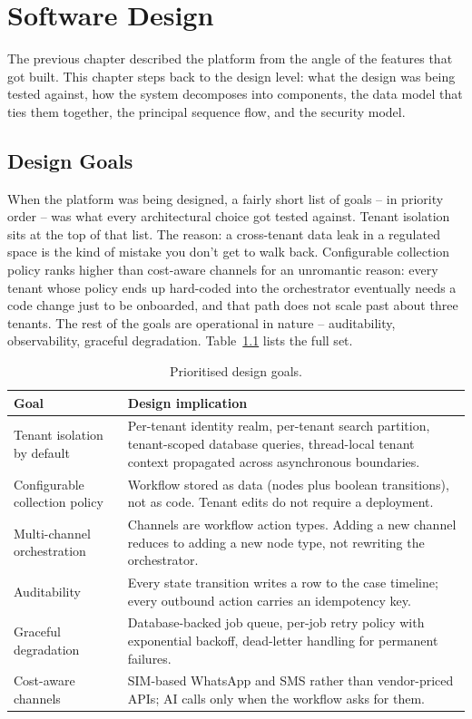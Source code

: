 \chapter{Software Design}
\label{Chapter 4}

The previous chapter described the platform from the angle of the features that got built. This chapter steps back to the design level: what the design was being tested against, how the system decomposes into components, the data model that ties them together, the principal sequence flow, and the security model.

\section{Design Goals}

When the platform was being designed, a fairly short list of goals -- in priority order -- was what every architectural choice got tested against. Tenant isolation sits at the top of that list. The reason: a cross-tenant data leak in a regulated space is the kind of mistake you don't get to walk back. Configurable collection policy ranks higher than cost-aware channels for an unromantic reason: every tenant whose policy ends up hard-coded into the orchestrator eventually needs a code change just to be onboarded, and that path does not scale past about three tenants. The rest of the goals are operational in nature -- auditability, observability, graceful degradation. Table~\ref{tab:design-goals} lists the full set.

\begin{table}[H]
\centering
\caption{Prioritised design goals.}
\label{tab:design-goals}
\begin{tabularx}{\textwidth}{l X}
\toprule
\textbf{Goal} & \textbf{Design implication} \\
\midrule
Tenant isolation by default & Per-tenant identity realm, per-tenant search partition, tenant-scoped database queries, thread-local tenant context propagated across asynchronous boundaries. \\
Configurable collection policy & Workflow stored as data (nodes plus boolean transitions), not as code. Tenant edits do not require a deployment. \\
Multi-channel orchestration & Channels are workflow action types. Adding a new channel reduces to adding a new node type, not rewriting the orchestrator. \\
Auditability & Every state transition writes a row to the case timeline; every outbound action carries an idempotency key. \\
Graceful degradation & Database-backed job queue, per-job retry policy with exponential backoff, dead-letter handling for permanent failures. \\
Cost-aware channels & SIM-based WhatsApp and SMS rather than vendor-priced APIs; AI calls only when the workflow asks for them. \\
\bottomrule
\end{tabularx}
\end{table}

